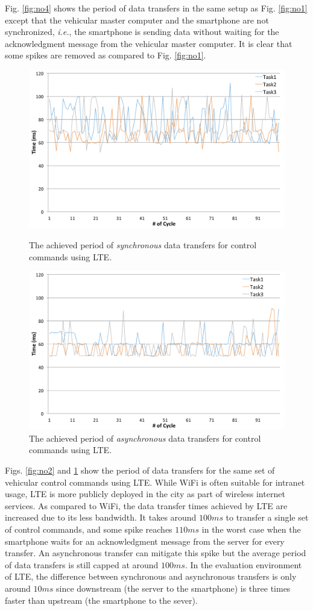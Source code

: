 Fig. \ref{fig:no4} shows the period of data transfers in the same
setup as Fig. \ref{fig:no1} except that the vehicular master computer and
the smartphone are not synchronized, \textit{i.e.}, the smartphone is
sending data without waiting for the acknowledgment message from the
vehicular master computer.
It is clear that some spikes are removed as compared to
Fig. \ref{fig:no1}.

\begin{figure}[!t]
 \centering
 \includegraphics[width=0.8\hsize]{fig/No2_Andrive_serv_cycle_LTE.pdf}
 \caption{The achieved period of \textit{synchronous} data transfers for
 control commands using LTE.}
 \label{fig:no2}
 \vspace{1em}
 \includegraphics[width=0.8\hsize]{fig/No5_Andrive_serv_cycle_LTE_only_send.pdf}
 \caption{The achieved period of \textit{asynchronous} data transfers for
 control commands using LTE.}
 \label{fig:no5}
\end{figure}

Figs. \ref{fig:no2} and \ref{fig:no5} show the period of data transfers
for the same set of vehicular control commands using LTE.
While WiFi is often suitable for intranet usage, LTE is more publicly
deployed in the city as part of wireless internet services.
As compared to WiFi, the data transfer times achieved by LTE are
increased due to its less bandwidth.
It takes around $100ms$ to transfer a single set of control commands,
and some spike reaches $110ms$ in the worst case when the smartphone
waits for an acknowledgment message from the server for every
transfer.
An asynchronous transfer can mitigate this spike but the average period
of data transfers is still capped at around $100ms$.
In the evaluation environment of LTE, 
the difference between synchronous and asynchronous transfers is only around $10ms$
since downstream (the server to the smartphone) is three times faster than upstream (the smartphone to the sever).

